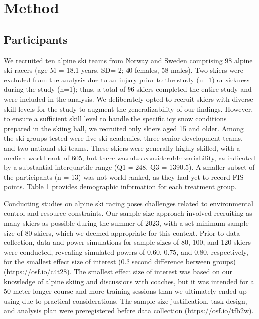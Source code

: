 \documentclass[pdflatex,sn-mathphys-num]{sn-jnl}%
\theoremstyle{thmstyleone}%
\theoremstyle{thmstyletwo}%
\theoremstyle{thmstylethree}%
\begin{document}
\section{Method}


\subsection{Participants}
We recruited ten alpine ski teams from Norway and Sweden comprising 98 alpine ski racers (age M = 18.1 years, SD= 2; 40 females, 58 males). Two skiers were excluded from the analysis due to an injury prior to the study (n=1) or sickness during the study (n=1); thus, a total of 96 skiers completed the entire study and were included in the analysis. We deliberately opted to recruit skiers with diverse skill levels for the study to augment the generalizability of our findings. However, to ensure a sufficient skill level to handle the specific icy snow conditions prepared in the skiing hall, we recruited only skiers aged 15 and older. Among the ski groups tested were five ski academies, three senior development teams, and two national ski teams. These skiers were generally highly skilled, with a median world rank of 605, but there was also considerable variability, as indicated by a substantial interquartile range (Q1 = 248, Q3 = 1390.5). A smaller subset of the participants (n = 13) was not world-ranked, as they had yet to record FIS points. Table 1 provides demographic information for each treatment group.

Conducting studies on alpine ski racing poses challenges related to environmental control and resource constraints. Our sample size approach involved recruiting as many skiers as possible during the summer of 2023, with a set minimum sample size of 80 skiers, which we deemed appropriate for this context. Prior to data collection, data and power simulations for sample sizes of 80, 100, and 120 skiers were conducted, revealing simulated powers of 0.60, 0.75, and 0.80, respectively, for the smallest effect size of interest (0.3 second difference between groups) (\url{https://osf.io/c4t28}). The smallest effect size of interest was based on our knowledge of alpine skiing and discussions with coaches, but it was intended for a 50-meter longer course and more training sessions than we ultimately ended up using due to practical considerations. The sample size justification, task design, and analysis plan were preregistered before data collection (\url{https://osf.io/tfb2w}).
\end{document}
